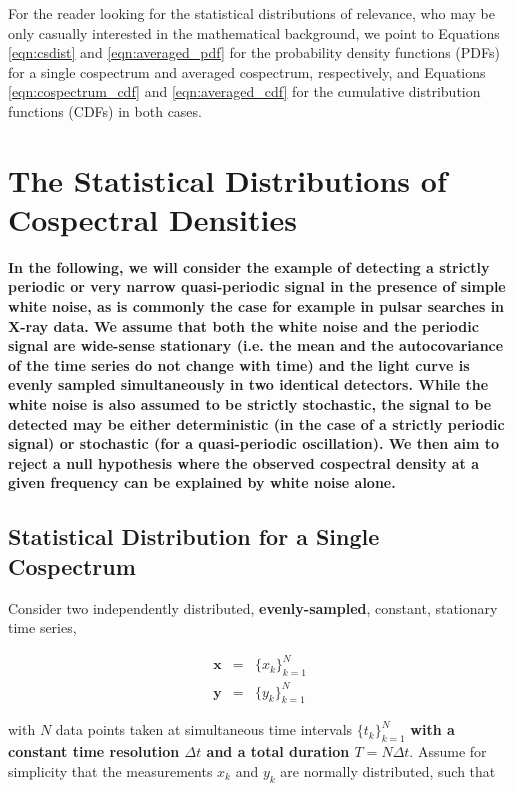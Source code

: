 \documentclass[12pt]{emulateapj}
\begin{document}
For the reader looking for the statistical distributions of relevance, who may be only casually interested in the mathematical background, we point to Equations \ref{eqn:csdist} and \ref{eqn:averaged_pdf} for the probability density functions (PDFs) for a single cospectrum and averaged cospectrum, respectively, and Equations \ref{eqn:cospectrum_cdf} and \ref{eqn:averaged_cdf} for the cumulative distribution functions (CDFs) in both cases.


\section{The Statistical Distributions of Cospectral Densities}
\label{sec:whitenoise_cospectra}

\textbf{In the following, we will consider the example of detecting a strictly periodic or very narrow quasi-periodic signal in the presence of simple white noise, as is commonly the case for example in pulsar searches in X-ray data. We assume that both the white noise and the periodic signal are wide-sense stationary (i.e. the mean and the autocovariance of the time series do not change with time) and the light curve is evenly sampled simultaneously in two identical detectors. While the white noise is also assumed to be strictly stochastic, the signal to be detected may be either deterministic (in the case of a strictly periodic signal) or stochastic (for a quasi-periodic oscillation). We then aim to reject a null hypothesis where the observed cospectral density at a given frequency can be explained by white noise alone.}

\subsection{Statistical Distribution for a Single Cospectrum}
\label{sec:single_cospectrum}

Consider two independently distributed, \textbf{evenly-sampled}, constant, stationary time series,

\begin{eqnarray}
\mathbf{x} &=& \{x_k\}_{k=1}^N \nonumber \\
\mathbf{y} &=& \{y_k\}_{k=1}^N \nonumber
\end{eqnarray}

\noindent with $N$ data points taken at simultaneous time intervals $\{t_k\}_{k=1}^N$ \textbf{with a constant time resolution $\Delta t$ and a total duration $T = N\Delta t$}. Assume for simplicity that the measurements $x_k$ and $y_k$ are normally distributed, such that 
\end{document}
